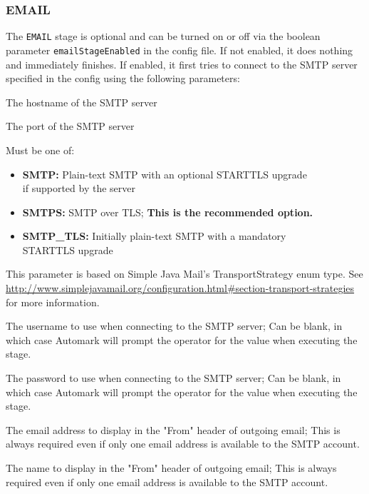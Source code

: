 \documentclass[12pt,a4paper,oneside]{report}
\begin{document}
	\subsubsection{EMAIL} \label{subsubsec:email}
	The \lstinline|EMAIL| stage is optional and can be turned on or off via the boolean parameter \lstinline|emailStageEnabled| in the config file. If not enabled, it does nothing and immediately finishes. If enabled, it first tries to connect to the SMTP server specified in the config using the following parameters:
	\begin{description}[align=left]
		\item[smtpHost] The hostname of the SMTP server
		\item[smtpPort] The port of the SMTP server
		\item[smtpProtocol] Must be one of:
			\begin{itemize}
				\item \textbf{SMTP:} Plain-text SMTP with an optional STARTTLS upgrade \\if supported by the server
				\item \textbf{SMTPS:} SMTP over TLS; \textbf{This is the recommended option.}
				\item \textbf{SMTP\_TLS:} Initially plain-text SMTP with a mandatory \\STARTTLS upgrade
			\end{itemize}
		This parameter is based on Simple Java Mail's TransportStrategy enum type. See \href{http://www.simplejavamail.org/configuration.html\#section-transport-strategies}{http://www.simplejavamail.org/configuration.html\#section-transport-strategies} for more information.
		\item[smtpUsername] The username to use when connecting to the SMTP server; Can be blank, in which case Automark will prompt the operator for the value when executing the stage.
		\item[smtpPassword] The password to use when connecting to the SMTP server; Can be blank, in which case Automark will prompt the operator for the value when executing the stage.
		\item[smtpFromAddress] The email address to display in the "From" header of outgoing email; This is always required even if only one email address is available to the SMTP account.
		\item[smtpFromName] The name to display in the "From" header of outgoing email; This is always required even if only one email address is available to the SMTP account.
	\end{description}
\end{document}
